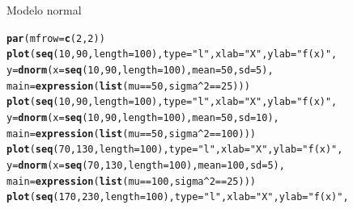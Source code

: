 \documentclass[10pt]{beamer}\usepackage[]{graphicx}\usepackage[]{color}
\makeatletter
\newcommand{\hlnum}[1]{\textcolor[rgb]{0.686,0.059,0.569}{#1}}%
\newcommand{\hlstr}[1]{\textcolor[rgb]{0.192,0.494,0.8}{#1}}%
\newcommand{\hlopt}[1]{\textcolor[rgb]{0,0,0}{#1}}%
\newcommand{\hlstd}[1]{\textcolor[rgb]{0.345,0.345,0.345}{#1}}%
\newcommand{\hlkwc}[1]{\textcolor[rgb]{0.333,0.667,0.333}{#1}}%
\newcommand{\hlkwd}[1]{\textcolor[rgb]{0.737,0.353,0.396}{\textbf{#1}}}%
\newenvironment{kframe}{%
 \def\at@end@of@kframe{}%
 \ifinner\ifhmode%
  \def\at@end@of@kframe{\end{minipage}}%
  \begin{minipage}{\columnwidth}%
 \fi\fi%
 \def\FrameCommand##1{\hskip\@totalleftmargin \hskip-\fboxsep
 \colorbox{shadecolor}{##1}\hskip-\fboxsep
     \hskip-\linewidth \hskip-\@totalleftmargin \hskip\columnwidth}%
 \MakeFramed {\advance\hsize-\width
   \@totalleftmargin\z@ \linewidth\hsize
   \@setminipage}}%
 {\par\unskip\endMakeFramed%
 \at@end@of@kframe}
\newenvironment{knitrout}{}{} %
\theoremstyle{definition}
\makeatother
\begin{document}
\begin{frame}[fragile]{Modelo normal}
\begin{knitrout}\footnotesize
{}\color{fgcolor}\begin{kframe}
\begin{alltt}
\hlkwd{par}\hlstd{(}\hlkwc{mfrow}\hlstd{=}\hlkwd{c}\hlstd{(}\hlnum{2}\hlstd{,}\hlnum{2}\hlstd{))}
\hlkwd{plot}\hlstd{(}\hlkwd{seq}\hlstd{(}\hlnum{10}\hlstd{,} \hlnum{90}\hlstd{,} \hlkwc{length}\hlstd{=}\hlnum{100}\hlstd{),} \hlkwc{type} \hlstd{=} \hlstr{"l"}\hlstd{,} \hlkwc{xlab} \hlstd{=} \hlstr{"X"}\hlstd{,} \hlkwc{ylab} \hlstd{=} \hlstr{"f(x)"}\hlstd{,}
     \hlkwc{y} \hlstd{=} \hlkwd{dnorm}\hlstd{(}\hlkwc{x} \hlstd{=} \hlkwd{seq}\hlstd{(}\hlnum{10}\hlstd{,} \hlnum{90}\hlstd{,} \hlkwc{length}\hlstd{=}\hlnum{100}\hlstd{),} \hlkwc{mean} \hlstd{=} \hlnum{50}\hlstd{,} \hlkwc{sd} \hlstd{=} \hlnum{5}\hlstd{),}
     \hlkwc{main} \hlstd{=} \hlkwd{expression}\hlstd{(}\hlkwd{list}\hlstd{(mu} \hlopt{==} \hlnum{50}\hlstd{, sigma}\hlopt{^}\hlnum{2} \hlopt{==} \hlnum{25}\hlstd{)))}
\hlkwd{plot}\hlstd{(}\hlkwd{seq}\hlstd{(}\hlnum{10}\hlstd{,} \hlnum{90}\hlstd{,} \hlkwc{length}\hlstd{=}\hlnum{100}\hlstd{),} \hlkwc{type} \hlstd{=} \hlstr{"l"}\hlstd{,} \hlkwc{xlab} \hlstd{=} \hlstr{"X"}\hlstd{,} \hlkwc{ylab} \hlstd{=} \hlstr{"f(x)"}\hlstd{,}
     \hlkwc{y} \hlstd{=} \hlkwd{dnorm}\hlstd{(}\hlkwc{x} \hlstd{=} \hlkwd{seq}\hlstd{(}\hlnum{10}\hlstd{,} \hlnum{90}\hlstd{,} \hlkwc{length}\hlstd{=}\hlnum{100}\hlstd{),} \hlkwc{mean} \hlstd{=} \hlnum{50}\hlstd{,} \hlkwc{sd} \hlstd{=} \hlnum{10}\hlstd{),}
     \hlkwc{main} \hlstd{=} \hlkwd{expression}\hlstd{(}\hlkwd{list}\hlstd{(mu} \hlopt{==} \hlnum{50}\hlstd{, sigma}\hlopt{^}\hlnum{2} \hlopt{==} \hlnum{100}\hlstd{)))}
\hlkwd{plot}\hlstd{(}\hlkwd{seq}\hlstd{(}\hlnum{70}\hlstd{,} \hlnum{130}\hlstd{,} \hlkwc{length}\hlstd{=}\hlnum{100}\hlstd{),} \hlkwc{type} \hlstd{=} \hlstr{"l"}\hlstd{,} \hlkwc{xlab} \hlstd{=} \hlstr{"X"}\hlstd{,} \hlkwc{ylab} \hlstd{=} \hlstr{"f(x)"}\hlstd{,}
     \hlkwc{y} \hlstd{=} \hlkwd{dnorm}\hlstd{(}\hlkwc{x} \hlstd{=} \hlkwd{seq}\hlstd{(}\hlnum{70}\hlstd{,} \hlnum{130}\hlstd{,} \hlkwc{length}\hlstd{=}\hlnum{100}\hlstd{),} \hlkwc{mean} \hlstd{=} \hlnum{100}\hlstd{,} \hlkwc{sd} \hlstd{=} \hlnum{5}\hlstd{),}
     \hlkwc{main} \hlstd{=} \hlkwd{expression}\hlstd{(}\hlkwd{list}\hlstd{(mu} \hlopt{==} \hlnum{100}\hlstd{, sigma}\hlopt{^}\hlnum{2} \hlopt{==} \hlnum{25}\hlstd{)))}
\hlkwd{plot}\hlstd{(}\hlkwd{seq}\hlstd{(}\hlnum{170}\hlstd{,} \hlnum{230}\hlstd{,} \hlkwc{length}\hlstd{=}\hlnum{100}\hlstd{),} \hlkwc{type} \hlstd{=} \hlstr{"l"}\hlstd{,} \hlkwc{xlab} \hlstd{=} \hlstr{"X"}\hlstd{,} \hlkwc{ylab} \hlstd{=} \hlstr{"f(x)"}\hlstd{,}

\end{alltt}
\end{kframe}
\end{knitrout}
\end{frame}
\end{document}
